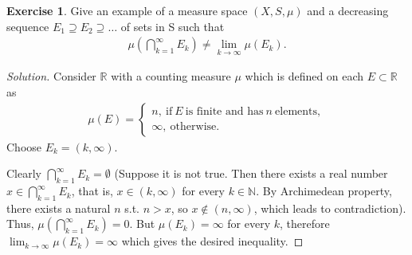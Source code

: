 \documentclass[letterpaper, 12pt, english]{article}
\theoremstyle{definition}
\theoremstyle{definition}
\newtheorem{problem}{Exercise}
\theoremstyle{definition}
\newenvironment{sol}{\begin{proof}[Solution]}{\end{proof}}
\theoremstyle{plain} %
\theoremstyle{plain} %
\theoremstyle{plain} %
\theoremstyle{plain} %
\theoremstyle{remark}
\begin{document}
\setcounter{problem}{9}
\begin{problem}
Give an example of a measure space $ (X, S, \mu ) $ and a decreasing sequence
$ E_{1} \supseteq E_{2} \supseteq \ldots $ of sets in S such that 
\begin{gather*}
    \mu \left( \bigcap_{k=1}^{ \infty} E_{k} \right) \ne \lim_{k \to \infty} \mu(E_{k}).
\end{gather*}
\begin{sol}
   Consider $ \mathbb{R} $ with a counting measure $ \mu $ which is
   defined on each $ E \subset \mathbb{R} $ as
   \begin{gather*}
       \mu(E) = 
      \begin{cases}
          n, ~\textrm{if}~ E ~\textrm{is finite and has}~n ~\textrm{elements}, \\ 
          \infty, ~\textrm{otherwise}.
      \end{cases}
   \end{gather*}
   Choose $ E_k = (k, \infty)$.

   Clearly $ \bigcap_{k=1}^{ \infty} E_{k} = \emptyset $ (Suppose it is not true.
   Then there exists a real number $ x \in \bigcap_{k=1}^{ \infty} E_{k} $,
   that is, $ x \in (k, \infty) $ for every $ k \in \mathbb{N} $.
   By Archimedean property, there exists a natural $ n $ s.t. $ n > x $, 
   so $ x \not \in (n, \infty) $, which leads to contradiction). Thus, 
   $ \mu \left( \bigcap_{k=1}^{ \infty} E_{k} \right) = 0 $. 
   But $ \mu(E_k) = \infty $ for every $ k $, therefore
   $ \lim_{k \to \infty} \mu(E_{k}) = \infty $  which gives the desired inequality.
\end{sol}
\end{problem}
 
\end{document}
